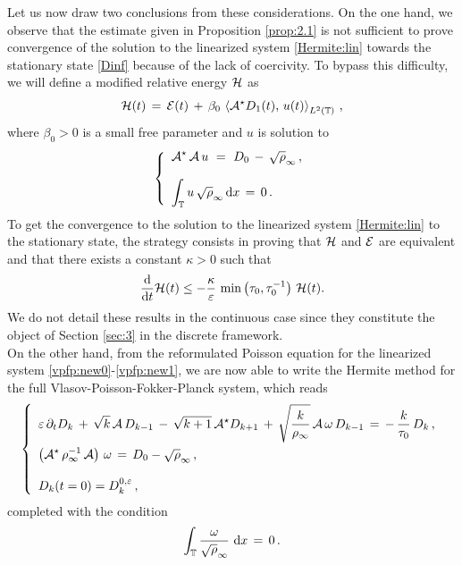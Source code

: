 \documentclass[11pt]{amsart}
\numberwithin{equation}{section}
\numberwithin{figure}{section}
\begin{document}
Let us now draw two conclusions from these considerations. On the one hand, we observe that the estimate given in Proposition \ref{prop:2.1} is not sufficient to prove convergence of
the solution to the linearized system \eqref{Hermite:lin} towards the stationary state
\eqref{Dinf} because of the lack of coercivity. To bypass this difficulty, we will define a modified relative energy ${\mathcal H}$ as
\begin{equation}
	{\mathcal H}(t) \,=\,
	{\mathcal E}(t)\,+\, \beta_0\,\left\langle
	{\mathcal A}^\star D_1(t),\, u(t)\right\rangle_{L^2\left({\mathbb T}\right)}\,,
	\label{eq:H0}
\end{equation}
where $\beta_0>0$ is a small free parameter and $u$ is solution to
$$
\left\{
\begin{array}{l}
	\displaystyle {\mathcal A}^\star\,{\mathcal A} \,u\ =\ D_0\,-\,\sqrt{\rho}_{\infty}\,,
	\\[1.1em]
	\displaystyle\int_{{\mathbb T}}u \,\sqrt\rho_{\infty}\,\mathrm{d} x \,=\,0\,.
\end{array}\right.
$$
To get the convergence to the solution to the linearized system
\eqref{Hermite:lin} to the stationary state, the strategy consists in
proving that ${\mathcal H}$ and ${\mathcal E}$ are equivalent and that there exists a
constant  $\kappa>0$ such that
$$
\frac{\mathrm{d}}{\mathrm{d} t} {\mathcal H}(t) \leq - \frac{\kappa}{\varepsilon}\,\min\left(\tau_0,\tau_0^{-1}\right)\, {\mathcal H}(t).
$$
We do not detail these results in the continuous case since they constitute the object of Section \ref{sec:3} in the discrete framework.\\
On the other hand, from the reformulated Poisson equation for the linearized system \eqref{vpfp:new0}-\eqref{vpfp:new1}, we are now able to write the Hermite method for the full Vlasov-Poisson-Fokker-Planck
system, which reads
\begin{equation}
  \label{Hermite:nlD}
  \left\{
    \begin{array}{l}
  \displaystyle\varepsilon\,\partial_t D_{k} \,+\,
      \sqrt{k}\,
      {\mathcal A}\,D_{k-1}\,- \, \sqrt{k +1}\,
        {\mathcal A}^\star D_{k+1}\,+\,\sqrt{\frac{k}{\rho_\infty}}\, {\mathcal A}\,
      \omega\, D_{k-1}
      \,  =\,  - \,  \frac{k}{\tau_0}\,  D_{k}\,,
         \\[1.2em]
      \displaystyle \left({\mathcal A}^\star\,\rho_{\infty}^{-1}\,{\mathcal A}\right) \,\omega\, =\, D_0-\sqrt{\rho}_{\infty}\,,
        \\[1.2em]
         \displaystyle D_{k}(t=0) =  D^{0,\varepsilon}_{k}\,,
\end{array}\right.
\end{equation}
completed with the condition 
\begin{equation*}
	\int_{{\mathbb T}} \frac{\omega}{\sqrt\rho_{\infty}} \,\,\mathrm{d} x \,=\,0\,.
\end{equation*}
\end{document}
